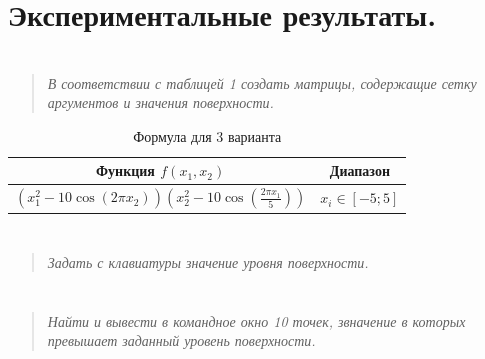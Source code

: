 \section*{Экспериментальные результаты.}
\section*{  }

\begin{quote}
    \textit{В соответствии с таблицей 1 создать матрицы, содержащие сетку аргументов и значения поверхности.}
\end{quote}

\begin{table}[H]
    \centering
    \caption{Формула для 3 варианта}
    \label{table:ex1}
    \begin{tabular}{cc}
            Функция $f(x_1, x_2)$ & Диапазон \\
        \toprule
            $ (x_1^2 - 10\cos(2\pi x_2)) (x_2^2-10\cos\left(\frac{2\pi x_1}{5}\right)) $ & $x_i\in[-5; 5]$
    \end{tabular}
\end{table}


\section*{  }
\begin{quote}
    \textit{Задать с клавиатуры значение уровня поверхности.}
\end{quote}


\section*{  }
\begin{quote}
    \textit{Найти и вывести в командное окно 10 точек, звначение в которых превышает заданный уровень поверхности. }
\end{quote}

